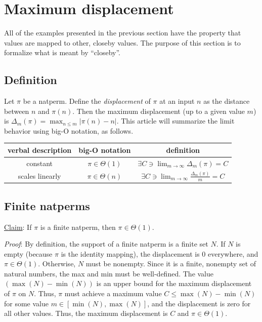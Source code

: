 \documentclass[12pt,reqno]{article}
\begin{document}
\section{Maximum displacement}

All of the examples presented in the previous section have the property that values are mapped to other, closeby values. The purpose of this section is to formalize what is meant by ``closeby''.

\subsection{Definition}

Let $\pi$ be a natperm. Define the \textit{displacement} of $\pi$ at an input $n$ as the distance between $n$ and $\pi(n)$. Then the maximum displacement (up to a given value $m$) is $\Delta_m(\pi) = \max_{n \leq m} | \pi(n) - n |$. This article will summarize the limit behavior using big-O notation, as follows.

\begin{center} \begin{tabular}{ |c|c|c| } 
  \hline
    verbal description & big-O notation       & definition \\
  \hline
    constant                & $\pi \in \Theta(1)$ & $\exists C \ni \lim_{m \rightarrow \infty} \Delta_m(\pi) = C$ \\
    scales linearly       & $\pi \in \Theta(n)$ & $\exists C \ni \lim_{m \rightarrow \infty} \frac{\Delta_m(\pi)}{m} = C$ \\
  \hline
\end{tabular} \end{center}

\subsection{Finite natperms}

\underline{Claim}: If $\pi$ is a finite natperm, then $\pi \in \Theta(1)$.

\textit{Proof}: By definition, the support of a finite natperm is a finite set $N$. If $N$ is empty (because $\pi$ is the identity mapping), the displacement is $0$ everywhere, and $\pi \in \Theta(1)$. Otherwise, $N$ must be nonempty. Since it is a finite, nonempty set of natural numbers, the max and min must be well-defined. The value $(\max(N) - \min(N))$ is an upper bound for the maximum displacement of $\pi$ on $N$. Thus, $\pi$ must achieve a maximum value $C \leq \max(N) - \min(N)$ for some value $m \in [ \min(N), \max(N) ] $, and the displacement is zero for all other values. Thus, the maximum displacement is $C$ and $\pi \in \Theta(1)$.
\end{document}

